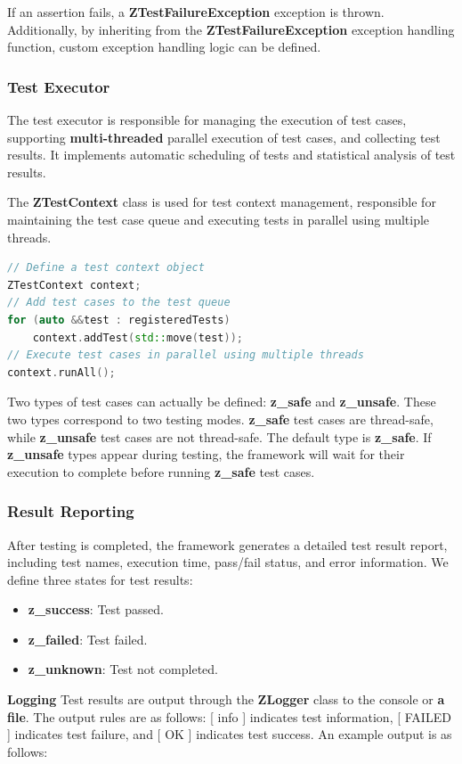 \documentclass[english]{article}
\begin{document}
If an assertion fails, a \textbf{ZTestFailureException} exception is thrown. Additionally, by inheriting from the \textbf{ZTestFailureException} exception handling function, custom exception handling logic can be defined.


\subsubsection{Test Executor}
The test executor is responsible for managing the execution of test cases, supporting \textbf{multi-threaded} parallel execution of test cases, and collecting test results. It implements automatic scheduling of tests and statistical analysis of test results.

The \textbf{ZTestContext} class is used for test context management, responsible for maintaining the test case queue and executing tests in parallel using multiple threads.
\begin{lstlisting}[language=C++]
// Define a test context object
ZTestContext context;
// Add test cases to the test queue
for (auto &&test : registeredTests) 
    context.addTest(std::move(test));
// Execute test cases in parallel using multiple threads
context.runAll();
\end{lstlisting}

Two types of test cases can actually be defined: \textbf{z\_safe} and \textbf{z\_unsafe}. These two types correspond to two testing modes. \textbf{z\_safe} test cases are thread-safe, while \textbf{z\_unsafe} test cases are not thread-safe. The default type is \textbf{z\_safe}. If \textbf{z\_unsafe} types appear during testing, the framework will wait for their execution to complete before running \textbf{z\_safe} test cases.

\subsubsection{Result Reporting}
After testing is completed, the framework generates a detailed test result report, including test names, execution time, pass/fail status, and error information.
We define three states for test results:
\begin{itemize}
    \item \textbf{z\_success}: Test passed.
    \item \textbf{z\_failed}: Test failed.
    \item \textbf{z\_unknown}: Test not completed.
\end{itemize}
\textbf{Logging} Test results are output through the \textbf{ZLogger} class to the console or \textbf{a file}.
The output rules are as follows:
[   info   ] indicates test information, [   FAILED  ] indicates test failure, and [   OK   ] indicates test success.
An example output is as follows:
\newpage
\end{document}
